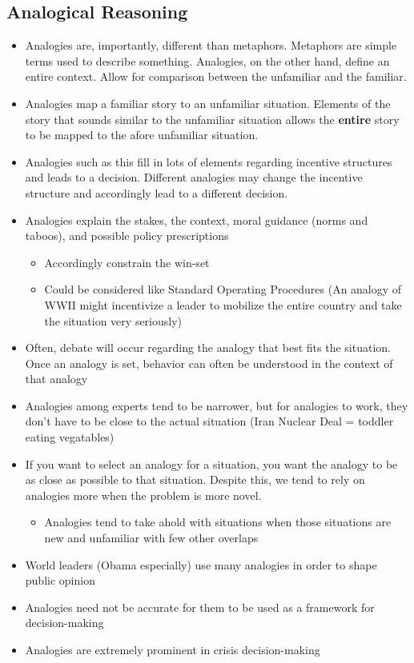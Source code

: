 \documentclass[11pt]{article}
\begin{document}
\subsection*{Analogical Reasoning}
\label{sec:org3e64297}
\begin{itemize}
\item Analogies are, importantly, different than metaphors. Metaphors are simple terms used to describe something. Analogies, on the other hand, define an entire context. Allow for comparison between the unfamiliar and the familiar.
\item Analogies map a familiar story to an unfamiliar situation. Elements of the story that sounds similar to the unfamiliar situation allows the \textbf{entire} story to be mapped to the afore unfamiliar situation.
\item Analogies such as this fill in lots of elements regarding incentive structures and leads to a decision. Different analogies may change the incentive structure and accordingly lead to a different decision.
\item Analogies explain the stakes, the context, moral guidance (norms and taboos), and possible policy prescriptions
\begin{itemize}
\item Accordingly constrain the win-set
\item Could be considered like Standard Operating Procedures (An analogy of WWII might incentivize a leader to mobilize the entire country and take the situation very seriously)
\end{itemize}
\item Often, debate will occur regarding the analogy that best fits the situation. Once an analogy is set, behavior can often be understood in the context of that analogy
\item Analogies among experts tend to be narrower, but for analogies to work, they don't have to be close to the actual situation (Iran Nuclear Deal = toddler eating vegatables)
\item If you want to select an analogy for a situation, you want the analogy to be as close as possible to that situation. Despite this, we tend to rely on analogies more when the problem is more novel.
\begin{itemize}
\item Analogies tend to take ahold with situations when those situations are new and unfamiliar with few other overlaps
\end{itemize}
\item World leaders (Obama especially) use many analogies in order to shape public opinion
\item Analogies need not be accurate for them to be used as a framework for decision-making
\item Analogies are extremely prominent in crisis decision-making
\end{itemize}
\end{document}
